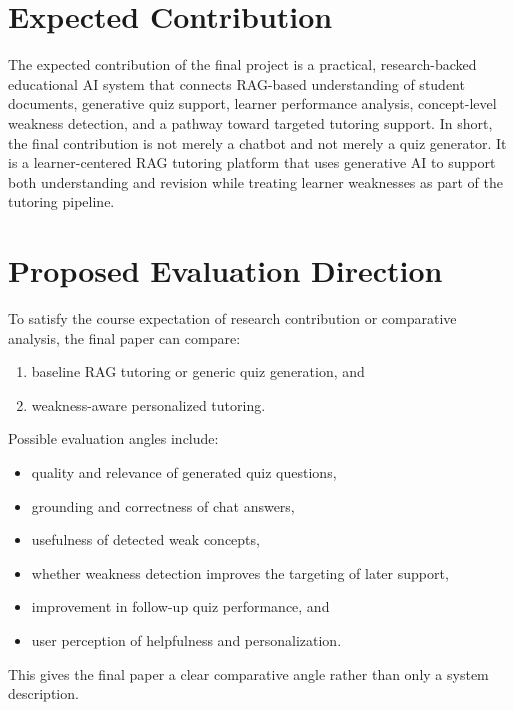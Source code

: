 \documentclass[11pt,a4paper]{article}
\begin{document}
\section{Expected Contribution}
The expected contribution of the final project is a practical, research-backed educational AI system that connects RAG-based understanding of student documents, generative quiz support, learner performance analysis, concept-level weakness detection, and a pathway toward targeted tutoring support. In short, the final contribution is not merely a chatbot and not merely a quiz generator. It is a learner-centered RAG tutoring platform that uses generative AI to support both understanding and revision while treating learner weaknesses as part of the tutoring pipeline.

\section{Proposed Evaluation Direction}
To satisfy the course expectation of research contribution or comparative analysis, the final paper can compare:

\begin{enumerate}
    \item baseline RAG tutoring or generic quiz generation, and
    \item weakness-aware personalized tutoring.
\end{enumerate}

Possible evaluation angles include:
\begin{itemize}
    \item quality and relevance of generated quiz questions,
    \item grounding and correctness of chat answers,
    \item usefulness of detected weak concepts,
    \item whether weakness detection improves the targeting of later support,
    \item improvement in follow-up quiz performance, and
    \item user perception of helpfulness and personalization.
\end{itemize}

This gives the final paper a clear comparative angle rather than only a system description.



\end{document}
